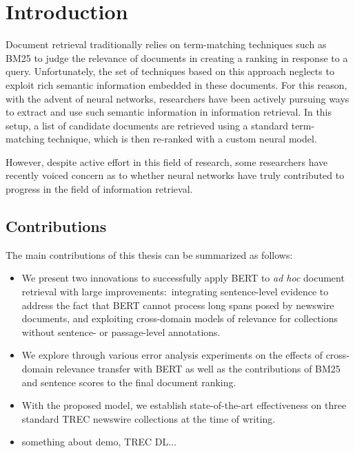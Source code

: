 \chapter{Introduction}


Document retrieval traditionally relies on term-matching techniques such as BM25 to judge the relevance of documents in creating a ranking in response to a query.
Unfortunately, the set of techniques based on this approach neglects to exploit rich semantic information embedded in these documents.
For this reason, with the advent of neural networks, researchers have been actively pursuing ways to extract and use such semantic information in information retrieval.
In this setup, a list of candidate documents are retrieved using a standard term-matching technique, which is then re-ranked with a custom neural model.

However, despite active effort in this field of research, some researchers have recently voiced concern as to whether neural networks have truly contributed to progress in the field of information retrieval.


\section{Contributions}

The main contributions of this thesis can be summarized as follows:\\

\begin{itemize}
\item
We present two innovations to successfully apply BERT to \textit{ad hoc} document retrieval with large improvements:\
integrating sentence-level evidence to address the fact that BERT cannot process long spans posed by newswire documents, and exploiting cross-domain models of relevance for collections without sentence- or passage-level annotations.
\item
We explore through various error analysis experiments on the effects of cross-domain relevance transfer with BERT as well as the contributions of BM25 and sentence scores to the final document ranking.
\item 
With the proposed model, we establish state-of-the-art effectiveness on three standard TREC newswire collections at the time of writing.\
\item
something about demo, TREC DL...

\end{itemize}

